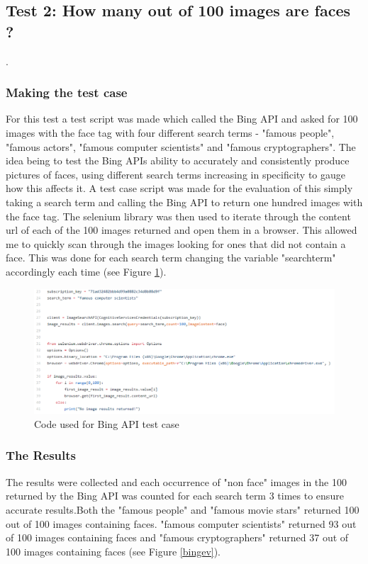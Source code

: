 \documentclass[12pt,a4paper]{article}
\begin{document}
\subsection{Test 2: How many out of 100 images are faces ?}.   
\subsubsection{Making the test case}
For this test a test script was made which called the Bing API and asked for 100 images with the face tag with four different search terms - "famous people", "famous actors", "famous computer scientists" and "famous cryptographers". The idea being to test the Bing APIs ability to accurately and consistently produce pictures of faces, using different search terms increasing in specificity to gauge how this affects it. A test case script was made for the evaluation of this simply taking a search term and calling the Bing API to return one hundred images with the face tag. The selenium library was then used to iterate through the content url of each of the 100 images returned and open them in a browser. This allowed me to quickly scan through the images looking for ones that did not contain a face. This was done for each search term changing the variable "search\textunderscore term" accordingly each time (see Figure \ref{bingevc}).  

\begin{figure}[!ht]
    \centering
    \includegraphics[width=1.0\textwidth]{Figs/bingevcode.PNG} 
    \caption{Code used for Bing API test case} 
    \label{bingevc}
\end{figure} 

\subsubsection{The Results} 

The results were collected and each occurrence of "non face"  images in the 100 returned by the Bing API was counted for each search term 3 times to ensure accurate results.Both the "famous people" and "famous movie stars" returned 100 out of 100 images containing faces. "famous computer scientists" returned 93 out of 100 images containing faces and "famous cryptographers" returned 37 out of 100 images containing faces (see Figure \ref{bingev}). 
\end{document}
